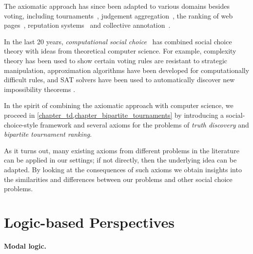 The axiomatic approach has since been adapted to various domains besides
voting, including tournaments~\cite{brandt2016a}, judgement
aggregation~\cite{endriss2016ja}, the ranking of web
pages~\cite{altman2005ranking}, reputation systems~\cite{tennenholtz2004} and
collective annotation~\cite{kruger2014}.


In the last 20 years, \emph{computational social choice}~\cite{moulin_2016} has
combined social choice theory with ideas from theoretical computer science. For
example, complexity theory has been used to show certain voting rules are
resistant to strategic manipulation, approximation algorithms have been
developed for computationally difficult rules, and SAT solvers have been used
to automatically discover new impossibility theorems .

In the spirit of combining the axiomatic approach with computer science, we
proceed in \cref{chapter_td,chapter_bipartite_tournaments} by introducing a
social-choice-style framework and several axioms for the problems of
\emph{truth discovery} and \emph{bipartite tournament ranking}. 

As it turns out, many existing axioms from different problems in the literature
can be applied in our settings; if not directly, then the underlying idea can
be adapted. By looking at the consequences of such axioms we obtain insights
into the similarities and differences between our problems and other social
choice problems. 

\section{Logic-based Perspectives}

\paragraph{Modal logic.}

